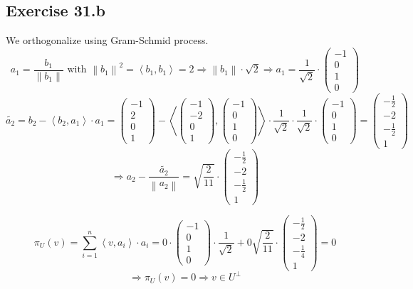 \documentclass[a4paper]{article}
\theoremstyle{definition}
\newcommand\fun[1]{\left\langle{#1}\right\rangle}
\newcommand\norm[1]{\left\|{#1}\right\|}
\begin{document}
\subsection{Exercise 31.b}
We orthogonalize using Gram-Schmid process.
\[ a_1 = \frac{b_1}{\norm{b_1}} \text{ with } \norm{b_1}^2 = \fun{b_1, b_1} = 2 \Rightarrow \norm{b_1} \cdot \sqrt{2} \Rightarrow a_1 = \frac{1}{\sqrt 2} \cdot \begin{pmatrix} -1 \\ 0 \\ 1 \\ 0 \end{pmatrix} \]
\[ \tilde{a_2} = b_2 - \fun{b_2, a_1} \cdot a_1 = \begin{pmatrix} -1 \\ 2 \\ 0 \\ 1 \end{pmatrix} - \fun{\begin{pmatrix} -1 \\ -2 \\ 0 \\ 1 \end{pmatrix}, \begin{pmatrix} -1 \\ 0 \\ 1 \\ 0 \end{pmatrix}} \cdot \frac{1}{\sqrt 2} \cdot \frac{1}{\sqrt 2} \cdot \begin{pmatrix} -1 \\ 0 \\ 1 \\ 0 \end{pmatrix} = \begin{pmatrix} -\frac12 \\ -2 \\ -\frac12 \\ 1 \end{pmatrix} \]
\[ \Rightarrow a_2 - \frac{\tilde{a_2}}{\norm{a_2}} = \sqrt{\frac2{11}} \cdot \begin{pmatrix} -\frac12 \\ -2 \\ -\frac12 \\ 1 \end{pmatrix} \]

\[ \pi_U(v) = \sum_{i=1}^n \fun{v, a_i} \cdot a_i = 0 \cdot \begin{pmatrix} -1 \\ 0 \\ 1 \\ 0 \end{pmatrix} \cdot \frac1{\sqrt{2}} + 0 \sqrt{\frac{2}{11}} \cdot \begin{pmatrix} -\frac12 \\ -2 \\ -\frac14 \\ 1 \end{pmatrix} = 0 \]
\[ \Rightarrow \pi_U(v) = 0 \Rightarrow v \in U^{\bot} \]
\end{document}
